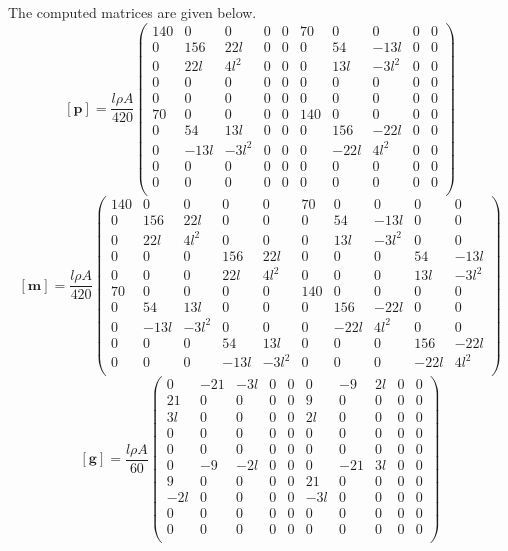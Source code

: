 The computed matrices are given below.
\[
\mathbf{[p]} = 
\frac{l\rho A}{420}\begin{pmatrix}
 140 &0 & 0 & 0 & 0 &  70 &0 & 0 & 0 & 0\\
   0 &   156 &   22l & 0 & 0 &   0 &    54 &  -13l & 0 & 0\\
   0 &  22l &  4l^2 & 0 & 0 &   0 &  13l & -3l^2 & 0 & 0\\
   0 &0 & 0 & 0 & 0 &   0 &0 & 0 & 0 & 0\\
   0 &0 & 0 & 0 & 0 &   0 &0 & 0 & 0 & 0\\
  70 &0 & 0 & 0 & 0 & 140 &0 & 0 & 0 & 0\\
   0 &    54 &   13l & 0 & 0 &   0 &   156 &  -22l & 0 & 0\\
   0 & -13l & -3l^2 & 0 & 0 &   0 & -22l &  4l^2 & 0 & 0\\
   0 &0 & 0 & 0 & 0 &   0 &0 & 0 & 0 & 0\\
   0 &0 & 0 & 0 & 0 &   0 &0 & 0 & 0 & 0\\
\end{pmatrix}
\]
\[
\mathbf{[m]} = 
\frac{l\rho A}{420}\begin{pmatrix}
 140 &0 & 0 &0 & 0 &  70 &0 & 0 &0 & 0\\
   0 &   156 &   22l &0 & 0 &   0 &    54 &  -13l &0 & 0\\
   0 &  22l &  4l^2 &0 & 0 &   0 &  13l & -3l^2 &0 & 0\\
   0 &0 & 0 &   156 &   22l &   0 &0 & 0 &    54 &  -13l\\
   0 &0 & 0 &  22l &  4l^2 &   0 &0 & 0 &  13l & -3l^2\\
  70 &0 & 0 &0 & 0 & 140 &0 & 0 &0 & 0\\
   0 &    54 &   13l &0 & 0 &   0 &   156 &  -22l &0 & 0\\
   0 & -13l & -3l^2 &0 & 0 &   0 & -22l &  4l^2 &0 & 0\\
   0 &0 & 0 &    54 &   13l &   0 &0 & 0 &   156 &  -22l\\
   0 &0 & 0 & -13l & -3l^2 &   0 &0 & 0 & -22l &  4l^2\\
\end{pmatrix}
\]
\[
\mathbf{[g]} = 
\frac{l\rho A}{60} \begin{pmatrix}
    0 & -21 & -3l & 0 & 0 &    0 &  -9 & 2l & 0 & 0\\
   21 &   0 &    0 & 0 & 0 &    9 &   0 &   0 & 0 & 0\\
  3l &   0 &    0 & 0 & 0 &  2l &   0 &   0 & 0 & 0\\
    0 &   0 &    0 & 0 & 0 &    0 &   0 &   0 & 0 & 0\\
    0 &   0 &    0 & 0 & 0 &    0 &   0 &   0 & 0 & 0\\
    0 &  -9 & -2l & 0 & 0 &    0 & -21 & 3l & 0 & 0\\
    9 &   0 &    0 & 0 & 0 &   21 &   0 &   0 & 0 & 0\\
 -2l &   0 &    0 & 0 & 0 & -3l &   0 &   0 & 0 & 0\\
    0 &   0 &    0 & 0 & 0 &    0 &   0 &   0 & 0 & 0\\
    0 &   0 &    0 & 0 & 0 &    0 &   0 &   0 & 0 & 0\\
\end{pmatrix}
\]


